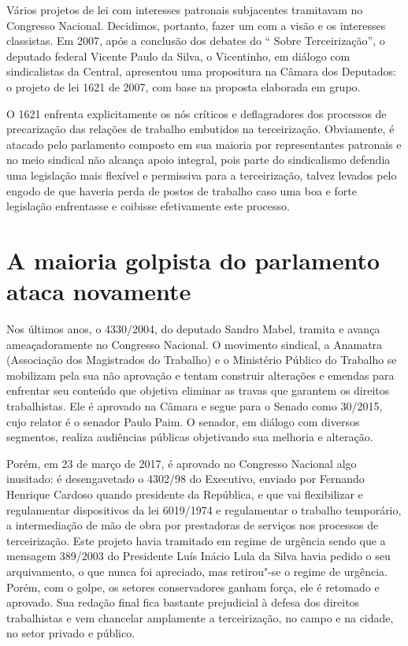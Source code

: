 Vários projetos de lei com interesses patronais subjacentes tramitavam no
Congresso Nacional. Decidimos, portanto, fazer um com a visão e os
interesses classistas. Em 2007, após a conclusão dos debates do ``
Sobre Terceirização'', o deputado federal Vicente Paulo da Silva, o
Vicentinho, em diálogo com sindicalistas da Central, apresentou uma
propositura na Câmara dos Deputados: o projeto de lei 1621 de 2007, com
base na proposta elaborada em grupo.

O  1621 enfrenta explicitamente os nós críticos e deflagradores dos
processos de precarização das relações de trabalho embutidos na
terceirização. Obviamente, é atacado pelo parlamento composto em sua
maioria por representantes patronais e no meio sindical não alcança
apoio integral, pois parte do sindicalismo defendia uma legislação mais
flexível e permissiva para a terceirização, talvez levados pelo engodo
de que haveria perda de postos de trabalho caso uma boa e forte
legislação enfrentasse e coibisse efetivamente este processo.

\section{A maioria golpista do parlamento ataca novamente}

Nos últimos anos, o  4330/2004, do deputado Sandro Mabel, tramita e
avança ameaçadoramente no Congresso Nacional. O movimento sindical, a
Anamatra (Associação dos Magistrados do Trabalho) e o Ministério Público
do Trabalho se mobilizam pela sua não aprovação e tentam construir
alterações e emendas para enfrentar seu conteúdo que objetiva eliminar
as travas que garantem os direitos trabalhistas. Ele é aprovado na
Câmara e segue para o Senado como 30/2015, cujo relator é o senador
Paulo Paim. O senador, em diálogo com diversos segmentos, realiza
audiências públicas objetivando sua melhoria e alteração.

Porém, em 23 de março de 2017, é aprovado no Congresso Nacional algo
inusitado: é desengavetado o  4302/98 do Executivo, enviado por
Fernando Henrique Cardoso quando presidente da República, e que vai
flexibilizar e regulamentar dispositivos da lei 6019/1974 e regulamentar
o trabalho temporário, a intermediação de mão de obra por prestadoras de
serviços nos processos de terceirização. Este projeto havia tramitado em
regime de urgência sendo que a mensagem 389/2003 do Presidente Luís
Inácio Lula da Silva havia pedido o seu arquivamento, o que nunca foi
apreciado, mas retirou"-se o regime de urgência. Porém, com o golpe, os
setores conservadores ganham força, ele é retomado e aprovado. Sua
redação final fica bastante prejudicial à defesa dos direitos
trabalhistas e vem chancelar amplamente a terceirização, no campo e na
cidade, no setor privado e público.

